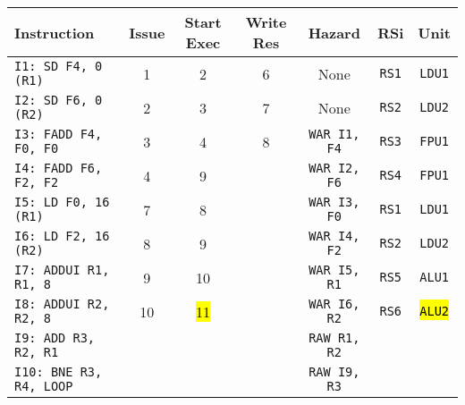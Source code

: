 \begin{enumerate}
    \begin{table}[!htp]
        \centering
        \begin{adjustbox}{width={\textwidth},totalheight={\textheight},keepaspectratio}
        \begin{tabular}{@{} l c c c c c c @{}}
            \toprule
            \textbf{Instruction} & \textbf{Issue} & \textbf{Start Exec} & \textbf{Write Res} & \textbf{Hazard} & \textbf{RSi} & \textbf{Unit} \\
            \midrule
            \texttt{I1: SD F4, 0 (R1)}      & 1 & 2 & 6 & None  & \texttt{RS1}   & \texttt{LDU1}  \\ [.5em]
            \texttt{I2: SD F6, 0 (R2)}      & 2 & 3 & 7 & None  & \texttt{RS2}   & \texttt{LDU2}  \\ [.5em]
            \texttt{I3: FADD F4, F0, F0}    & 3 & 4 & 8 & \texttt{WAR I1, F4}  & \texttt{RS3} & \texttt{FPU1} \\ [.5em]
            \texttt{I4: FADD F6, F2, F2}    & 4 & 9 &   & \texttt{WAR I2, F6} & \texttt{RS4} & \texttt{FPU1} \\ [.5em]
            \texttt{I5: LD F0, 16 (R1)}     & 7 & 8 &   & \texttt{WAR I3, F0} & \texttt{RS1} & \texttt{LDU1} \\ [.5em]
            \texttt{I6: LD F2, 16 (R2)}     & 8 & 9 &   & \texttt{WAR I4, F2} & \texttt{RS2} & \texttt{LDU2} \\ [.5em]
            \texttt{I7: ADDUI R1, R1, 8}    & 9 & 10 &   & \texttt{WAR I5, R1} & \texttt{RS5} & \texttt{ALU1} \\ [.5em]
            \texttt{I8: ADDUI R2, R2, 8}    & 10 & \hl{11} &   & \texttt{WAR I6, R2} & \texttt{RS6} & \hl{\texttt{ALU2}} \\ [.5em]
            \texttt{I9: ADD R3, R2, R1}     &   &   &   & \texttt{RAW R1, R2} &       &       \\ [.5em]
            \texttt{I10: BNE R3, R4, LOOP}   &   &   &   & \texttt{RAW I9, R3} &       &       \\
            \bottomrule
        \end{tabular}
        \end{adjustbox}
    \end{table}
    

\end{enumerate}
